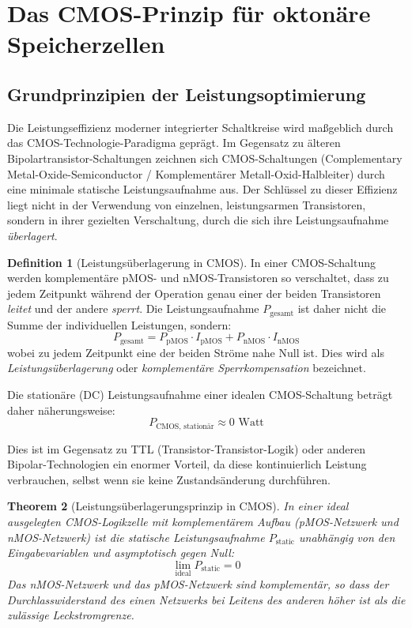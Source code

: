\documentclass[12pt, a4paper]{article}
\newtheorem{theorem}{Theorem}[section]
\theoremstyle{definition}
\newtheorem{definition}[theorem]{Definition}
\theoremstyle{remark}
\begin{document}
\section{Das CMOS-Prinzip für oktonäre Speicherzellen}
\label{sec:cmos_oktonaer}

\subsection{Grundprinzipien der Leistungsoptimierung}
\label{subsec:cmos_grundprinzipien}

Die Leistungseffizienz moderner integrierter Schaltkreise wird maßgeblich durch das CMOS-Technologie-Paradigma geprägt. Im Gegensatz zu älteren Bipolartransistor-Schaltungen zeichnen sich CMOS-Schaltungen (Complementary Metal-Oxide-Semiconductor / Komplementärer Metall-Oxid-Halbleiter) durch eine minimale statische Leistungsaufnahme aus. Der Schlüssel zu dieser Effizienz liegt nicht in der Verwendung von einzelnen, leistungsarmen Transistoren, sondern in ihrer gezielten Verschaltung, durch die sich ihre Leistungsaufnahme \textit{überlagert}.

\begin{definition}[Leistungsüberlagerung in CMOS]
\label{def:leistungsueberlag}
In einer CMOS-Schaltung werden komplementäre pMOS- und nMOS-Transistoren so verschaltet, dass zu jedem Zeitpunkt während der Operation genau einer der beiden Transistoren \textit{leitet} und der andere \textit{sperrt}. Die Leistungsaufnahme $P_{\mathrm{gesamt}}$ ist daher nicht die Summe der individuellen Leistungen, sondern:
\[
P_{\mathrm{gesamt}} = P_{\mathrm{pMOS}} \cdot I_{\mathrm{pMOS}} + P_{\mathrm{nMOS}} \cdot I_{\mathrm{nMOS}}
\]
wobei zu jedem Zeitpunkt eine der beiden Ströme nahe Null ist. Dies wird als \emph{Leistungsüberlagerung} oder \emph{komplementäre Sperrkompensation} bezeichnet.
\end{definition}

Die stationäre (DC) Leistungsaufnahme einer idealen CMOS-Schaltung beträgt daher näherungsweise:
\[
P_{\text{CMOS, stationär}} \approx 0 \text{ Watt}
\]

Dies ist im Gegensatz zu TTL (Transistor-Transistor-Logik) oder anderen Bipolar-Technologien ein enormer Vorteil, da diese kontinuierlich Leistung verbrauchen, selbst wenn sie keine Zustandsänderung durchführen.

\begin{theorem}[Leistungsüberlagerungsprinzip in CMOS]
\label{thm:leistungsueberlagering_cmos}
In einer ideal ausgelegten CMOS-Logikzelle mit komplementärem Aufbau (pMOS-Netzwerk und nMOS-Netzwerk) ist die statische Leistungsaufnahme $P_{\mathrm{static}}$ unabhängig von den Eingabevariablen und asymptotisch gegen Null:
\[
\lim_{\text{ideal}} P_{\mathrm{static}} = 0
\]
Das nMOS-Netzwerk und das pMOS-Netzwerk sind komplementär, so dass der Durchlasswiderstand des einen Netzwerks bei Leitens des anderen höher ist als die zulässige Leckstromgrenze.
\end{theorem}
\end{document}
